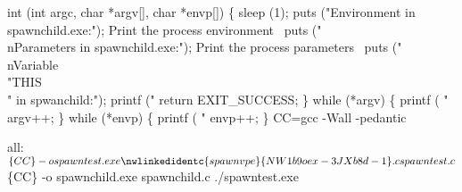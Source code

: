 \documentclass[11pt,a4paper]{article}%
\begin{document}
int 
 (int argc, char *argv[], char *envp[])
\{
  sleep (1);
  puts ("Environment in spawnchild.exe:");
  \LA{}Print the process environment~{\nwtagstyle{}}\RA{}
  puts ("\\nParameters in spawnchild.exe:");
  \LA{}Print the process parameters~{\nwtagstyle{}}\RA{}
  puts ("\\nVariable \\"THIS\\" in spwanchild:");
  printf ("%
  return EXIT_SUCCESS;
\}
\eatline
{}\nwendcode{}\endmoddef\nwstartdeflinemarkup{}\nwenddeflinemarkup
while (*argv)
\{
  printf ( "%
  argv++;
\}
\nwendcode{}\endmoddef\nwstartdeflinemarkup{}\nwenddeflinemarkup
while (*envp)
\{
  printf ( "%
  envp++;
\}
\nwendcode{}\endmoddef\nwstartdeflinemarkup\nwenddeflinemarkup
CC=gcc -Wall -pedantic

all:
  $\{CC\} -o spawntest.exe \nwlinkedidentc{spawnvpe}{NW1b9oex-3JXb8d-1}.c spawntest.c
  $\{CC\} -o spawnchild.exe spawnchild.c
  ./spawntest.exe


\nwendcode{}
\end{document}
